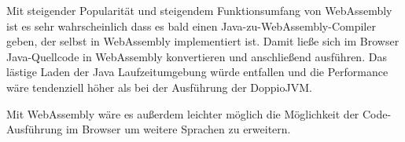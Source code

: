 Mit steigender Popularität und steigendem Funktionsumfang von WebAssembly ist es sehr wahrscheinlich dass es bald einen Java-zu-WebAssembly-Compiler geben, der selbst in WebAssembly implementiert ist. Damit ließe sich im Browser Java-Quellcode in WebAssembly konvertieren und anschließend ausführen. Das lästige Laden der Java Laufzeitumgebung würde entfallen und die Performance wäre tendenziell höher als bei der Ausführung der DoppioJVM.

Mit WebAssembly wäre es außerdem leichter möglich die Möglichkeit der Code-Ausführung im Browser um weitere Sprachen zu erweitern.